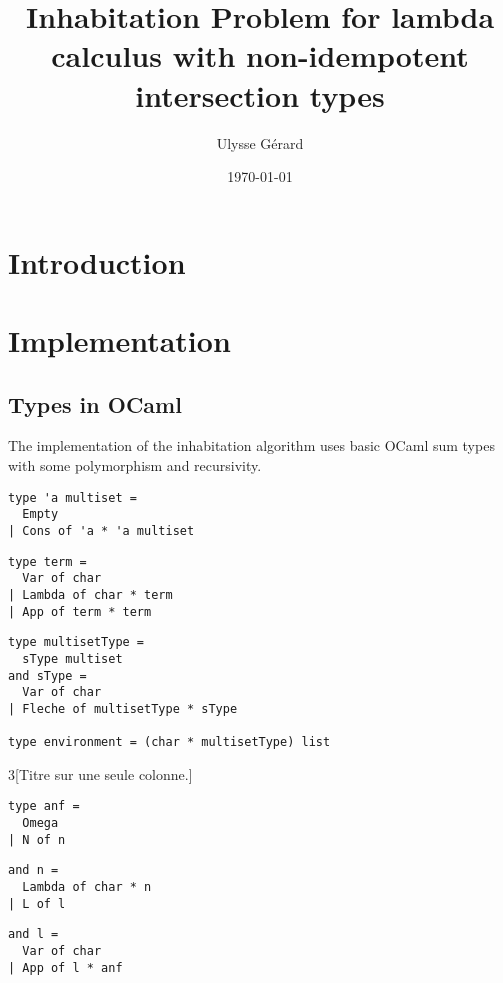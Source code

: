 \documentclass{article}
\title{\textbf{Inhabitation Problem for lambda calculus with non-idempotent intersection types}}
\author{Ulysse Gérard}
\date\today
\begin{document}
\maketitle

\section{Introduction}


\section{Implementation}
\subsection{Types in OCaml}
The implementation of the inhabitation algorithm uses basic OCaml sum types with some polymorphism and recursivity.

\begin{lstlisting}[caption={Multisets}]
type 'a multiset =
  Empty
| Cons of 'a * 'a multiset
\end{lstlisting}

\begin{lstlisting}[caption={$\lambda$-calculus}]
type term = 
  Var of char
| Lambda of char * term 
| App of term * term
\end{lstlisting}

\begin{lstlisting}[caption={Intersection types and environments}]
type multisetType = 
  sType multiset
and sType = 
  Var of char
| Fleche of multisetType * sType

type environment = (char * multisetType) list
\end{lstlisting}

\begin{multicols}{3}[Titre sur une seule colonne.]
\begin{lstlisting}[caption={Approximate normal forms}]
type anf = 
  Omega
| N of n
\end{lstlisting}
\columnbreak
\begin{lstlisting}[caption={Approximate normal forms}]
and n = 
  Lambda of char * n
| L of l
\end{lstlisting}
\columnbreak
\begin{lstlisting}[caption={Approximate normal forms}]
and l =
  Var of char
| App of l * anf
\end{lstlisting}
\end{multicols}
\end{document}
